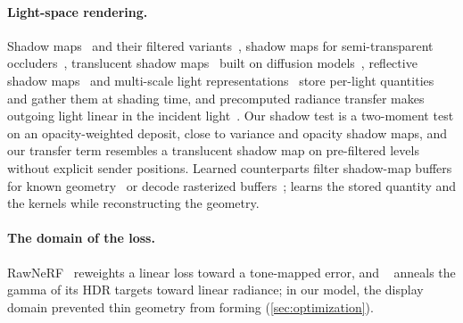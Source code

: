 \paragraph{Light-space rendering.}
Shadow maps~\cite{williams1978casting} and their filtered variants~\cite{reeves1987rendering,fernando2005percentage,donnelly2006variance,annen2007convolution,annen2008exponential,peters2015moment}, shadow maps for semi-transparent occluders~\cite{lokovic2000deep,kim2001opacity,yuksel2008deep,jansen2010fourier,salvi2010adaptive,peters2016beyond}, translucent shadow maps~\cite{dachsbacher2003translucent,jimenez2010real} built on diffusion models~\cite{jensen2001practical,deon2007efficient}, reflective shadow maps~\cite{dachsbacher2005reflective,dachsbacher2006splatting} and multi-scale light representations~\cite{kaplanyan2010cascaded,crassin2011interactive} store per-light quantities and gather them at shading time, and precomputed radiance transfer makes outgoing light linear in the incident light~\cite{sloan2002precomputed}.
Our shadow test is a two-moment test on an opacity-weighted deposit, close to variance and opacity shadow maps, and our transfer term resembles a translucent shadow map on pre-filtered levels without explicit sender positions.
Learned counterparts filter shadow-map buffers for known geometry~\cite{datta2022neural} or decode rasterized buffers~\cite{nalbach2017deep,thies2019deferred,gao2020deferred,zhang2021neural,ye2024deferred}; \ours learns the stored quantity and the kernels while reconstructing the geometry.

\paragraph{The domain of the loss.}
RawNeRF~\cite{mildenhall2022nerf} reweights a linear loss toward a tone-mapped error, and \gsthree~\cite{bi2024gs3} anneals the gamma of its HDR targets toward linear radiance; in our model, the display domain prevented thin geometry from forming (\cref{sec:optimization}).
